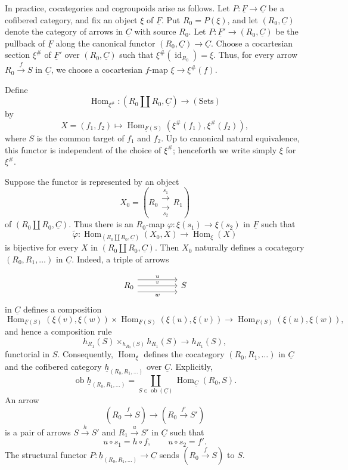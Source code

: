 In practice, cocategories and cogroupoids arise as follows. Let
$P:\underline F\longrightarrow\underline C$ be a cofibered category,
and fix an object $\xi$ of $\underline F$. Put $R_0=P(\xi)$, and let
$(R_0,\underline C)$ denote the category of arrows in $\underline C$
with source $R_0$. Let
$P:\underline F'\longrightarrow(R_0,\underline C)$ be the pullback of
$\underline F$ along the canonical functor
$(R_0,\underline C)\longrightarrow\underline C$. Choose a
cocartesian section $\xi^{\#}$ of $\underline F'$ over
$(R_0,\underline C)$ such that
$\xi^{\#}(\operatorname{id}_{R_0})=\xi$. Thus, for every arrow
$R_0\xrightarrow fS$ in $\underline C$, we choose a cocartesian
$f$-map $\xi\longrightarrow\xi^{\#}(f)$.

Define
\[
 \operatorname{Hom}_{\xi^{\#}}:
 (R_0\amalg R_0,\underline C)\longrightarrow(\mathrm{Sets})
\]
by
\[
 X=(f_1,f_2)\longmapsto
 \operatorname{Hom}_{\underline F(S)}
   (\xi^{\#}(f_1),\xi^{\#}(f_2)),
\]
where $S$ is the common target of $f_1$ and $f_2$. Up to canonical
natural equivalence, this functor is independent of the choice of
$\xi^{\#}$; henceforth we write simply $\xi$ for $\xi^{\#}$.

Suppose the functor is represented by an object
\[
 X_0=
 \left(R_0\mathrel{\substack{\xrightarrow{\ s_1\ }\\[-.6ex]
                              \xrightarrow[\ s_2\ ]{}}}R_1\right)
\]
of $(R_0\amalg R_0,\underline C)$. Thus there is an $R_0$-map
$\varphi:\xi(s_1)\longrightarrow\xi(s_2)$ in $\underline F$ such
that
\[
 \widetilde\varphi:
 \operatorname{Hom}_{(R_0\amalg R_0,\underline C)}(X_0,X)
 \longrightarrow\operatorname{Hom}_\xi(X)
\]
is bijective for every $X$ in $(R_0\amalg R_0,\underline C)$. Then
$X_0$ naturally defines a cocategory $(R_0,R_1,\ldots)$ in
$\underline C$. Indeed, a triple of arrows


\[
\begin{tikzcd}[column sep=huge]
 R_0 \arrow[r,shift left=3,"u"]
     \arrow[r,"v"]
     \arrow[r,shift right=3,"w"']
 & S
\end{tikzcd}
\]
in $\underline C$ defines a composition
\[
 \operatorname{Hom}_{\underline F(S)}(\xi(v),\xi(w))
 \times
 \operatorname{Hom}_{\underline F(S)}(\xi(u),\xi(v))
 \longrightarrow
 \operatorname{Hom}_{\underline F(S)}(\xi(u),\xi(w)),
\]
and hence a composition rule
\[
 h_{R_1}(S)\times_{h_{R_0}(S)}h_{R_1}(S)
 \longrightarrow h_{R_1}(S),
\]
functorial in $S$. Consequently, $\operatorname{Hom}_\xi$ defines the
cocategory $(R_0,R_1,\ldots)$ in $\underline C$ and the cofibered
category $\underline h_{(R_0,R_1,\ldots)}$ over $\underline C$.
Explicitly,
\[
 \operatorname{ob}\underline h_{(R_0,R_1,\ldots)}
 =\coprod_{S\in\operatorname{ob}(\underline C)}
   \operatorname{Hom}_{\underline C}(R_0,S).
\]
An arrow
\[
 (R_0\xrightarrow fS)\longrightarrow(R_0\xrightarrow{f'}S')
\]
is a pair of arrows $S\xrightarrow hS'$ and $R_1\xrightarrow uS'$ in
$\underline C$ such that
\[
 u\circ s_1=h\circ f,
 \qquad u\circ s_2=f'.
\]
The structural functor
$P:\underline h_{(R_0,R_1,\ldots)}\longrightarrow\underline C$ sends
$(R_0\xrightarrow fS)$ to $S$.

